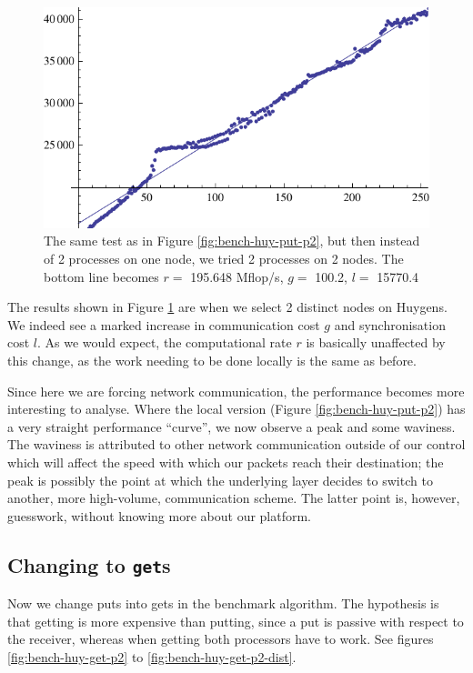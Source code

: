 \documentclass[a4paper]{article}
\begin{document}
\begin{figure}[h]
    \begin{center}
        \includegraphics{img/bench-huy-put-p2-dist.pdf}
    \end{center}
    \caption{The same test as in Figure \ref{fig:bench-huy-put-p2}, but then
    instead of 2 processes on one node, we tried 2 processes on 2 nodes. The
    bottom line becomes $r=$ 195.648 Mflop/s, $g=$ 100.2, $l=$ 15770.4}
    \label{fig:bench-huy-put-p2-dist}
\end{figure}

The results shown in Figure \ref{fig:bench-huy-put-p2-dist} are when we select 2
distinct nodes on Huygens. We indeed see a marked increase in communication cost
$g$ and synchronisation cost $l$. As we would expect, the computational rate $r$
is basically unaffected by this change, as the work needing to be done locally
is the same as before. 

Since here we are forcing network communication, the performance becomes more
interesting to analyse. Where the local version (Figure
\ref{fig:bench-huy-put-p2}) has a very straight performance ``curve'', we now
observe a peak and some waviness. The waviness is attributed to other network
communication outside of our control which will affect the speed with which our
packets reach their destination; the peak is possibly the point at which the
underlying layer decides to switch to another, more high-volume, communication
scheme. The latter point is, however, guesswork, without knowing more about our
platform. 

\subsection{Changing to \texttt{get}s}
Now we change puts into gets in the benchmark algorithm. The hypothesis is that
getting is more expensive than putting, since a put is passive with respect to
the receiver, whereas when getting both processors have to work. See figures
\ref{fig:bench-huy-get-p2} to \ref{fig:bench-huy-get-p2-dist}. 
\end{document}
